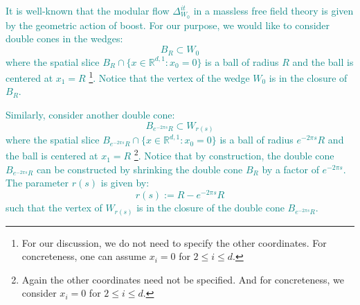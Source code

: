\documentclass[a4paper,11pt]{article}
\theoremstyle{definition}
\newcommand{\YC}[1]{\textcolor{teal}{#1}}
\begin{document}
\YC{
It is well-known \cite{bisognanowichmann}that the modular flow $\Delta_{W_0}^{it}$ in a massless free field theory is given by the geometric action of boost. For our purpose, we would like to consider double cones in the wedges:
\begin{equation}
    B_R\subset W_0
\end{equation}
where the spatial slice $B_R\cap \{x\in \mathbb{R}^{d,1}: x_0 = 0\}$ is a ball of radius $R$ and the ball is centered at $x_1 = R$ \footnote{For our discussion, we do not need to specify the other coordinates. For concreteness, one can assume $x_i = 0$ for $2\leq i\leq d$.}. Notice that the vertex of the wedge $W_0$ is in the closure of $B_R$. 
}

\YC{
Similarly, consider another double cone:
\begin{equation}
    B_{e^{-2\pi s}R}\subset W_{r(s)}
\end{equation}
where the spatial slice $B_{e^{-2\pi s}R}\cap \{x\in\mathbb{R}^{d,1}: x_0 = 0\}$ is a ball of radius $e^{-2\pi s}R$ and the ball is centered at $x_1 = R$ \footnote{Again the other coordinates need not be specified. And for concreteness, we consider $x_i = 0$ for $2\leq i\leq d$.}. Notice that by construction, the double cone $B_{e^{-2\pi s}R}$ can be constructed by shrinking the double cone $B_R$ by a factor of $e^{-2\pi s}$. The parameter $r(s)$ is given by:
\begin{equation}
    r(s) := R - e^{-2\pi s}R
\end{equation}
such that the vertex of $W_{r(s)}$ is in the closure of the double cone $B_{e^{-2\pi s} R}$. 
}
\end{document}
